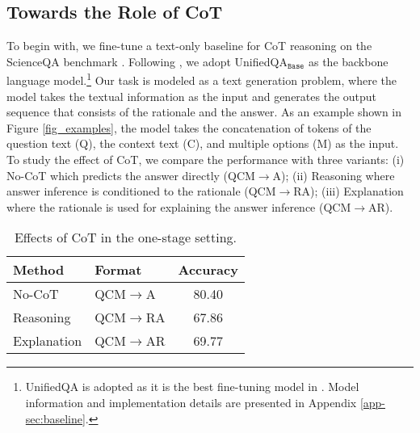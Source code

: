 \documentclass[nohyperref]{article}
\theoremstyle{plain}
\theoremstyle{definition}
\theoremstyle{remark}
\begin{document}
\subsection{Towards the Role of CoT}
To begin with, we fine-tune a text-only baseline for CoT reasoning on the ScienceQA benchmark \citep{lu2022learn}. Following \citet{lu2022learn}, we adopt UnifiedQA$_\texttt{Base}$ \citep{khashabi2020unifiedqa} as the backbone language model.\footnote{{UnifiedQA \citep{khashabi2020unifiedqa} is adopted as it is the best fine-tuning model in \citet{lu2022learn}. Model information and implementation details are presented in Appendix \ref{app-sec:baseline}.}} Our task is modeled as a text generation problem, where the model takes the textual information as the input and generates the output sequence
that consists of the rationale and the answer. As an example shown in Figure \ref{fig_examples}, the model takes the
concatenation of tokens of the question text (Q), the context text (C), and multiple options (M) as the input. To study the effect of CoT, we compare the performance with three variants: (i) No-CoT which predicts the answer directly (QCM$\rightarrow$A); (ii) Reasoning where answer inference is conditioned to the rationale (QCM$\rightarrow$RA); (iii) Explanation where the rationale is used for explaining the answer inference (QCM$\rightarrow$AR).



\begin{table}[htb]
    \centering\small
      \vspace{-3.6mm}
        \caption{Effects of CoT in {the one-stage setting}.\label{tab:pre_position}}
         \setlength{\tabcolsep}{12pt}
         {
        \begin{tabular}{llc}\toprule
         {Method} & {Format} & {Accuracy} \\\midrule
        No-CoT & QCM$\rightarrow$A   & 80.40 \\
        \midrule
        Reasoning &  QCM$\rightarrow$RA   & 67.86\\
        Explanation &  QCM$\rightarrow$AR   & 69.77\\
        \bottomrule
        \end{tabular}
        \vspace{-1.8mm}
}
\end{table}
\end{document}
